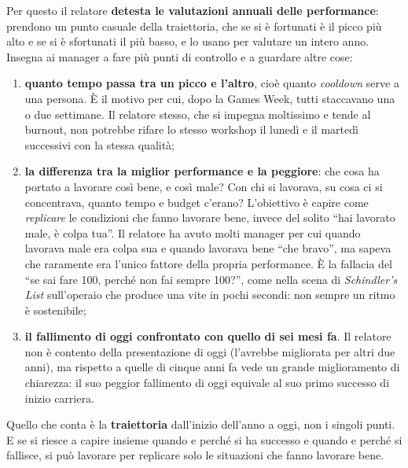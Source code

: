 Per questo il relatore \textbf{detesta le valutazioni annuali delle
performance}: prendono un punto casuale della traiettoria, che se si è
fortunati è il picco più alto e se si è sfortunati il più basso, e lo usano
per valutare un intero anno. Insegna ai manager a fare più punti di controllo
e a guardare altre cose:
\begin{enumerate}
  \item \textbf{quanto tempo passa tra un picco e l'altro}, cioè quanto
        \emph{cooldown} serve a una persona. È il motivo per cui, dopo la
        Games Week, tutti staccavano una o due settimane. Il relatore stesso,
        che si impegna moltissimo e tende al burnout, non potrebbe rifare lo
        stesso workshop il lunedì e il martedì successivi con la stessa
        qualità;
  \item \textbf{la differenza tra la miglior performance e la peggiore}: che
        cosa ha portato a lavorare così bene, e così male? Con chi si
        lavorava, su cosa ci si concentrava, quanto tempo e budget c'erano?
        L'obiettivo è capire come \emph{replicare} le condizioni che fanno
        lavorare bene, invece del solito ``hai lavorato male, è colpa tua''.
        Il relatore ha avuto molti manager per cui quando lavorava male era
        colpa sua e quando lavorava bene ``che bravo'', ma sapeva che raramente
        era l'unico fattore della propria performance. È la fallacia del ``se
        sai fare 100, perché non fai sempre 100?'', come nella scena di
        \emph{Schindler's List} sull'operaio che produce una vite in pochi
        secondi: non sempre un ritmo è sostenibile;
  \item \textbf{il fallimento di oggi confrontato con quello di sei mesi fa}.
        Il relatore non è contento della presentazione di oggi (l'avrebbe
        migliorata per altri due anni), ma rispetto a quelle di cinque anni fa
        vede un grande miglioramento di chiarezza: il suo peggior fallimento di
        oggi equivale al suo primo successo di inizio carriera.
\end{enumerate}
Quello che conta è la \textbf{traiettoria} dall'inizio dell'anno a oggi, non
i singoli punti. E se si riesce a capire insieme quando e perché si ha
successo e quando e perché si fallisce, si può lavorare per replicare solo le
situazioni che fanno lavorare bene.

